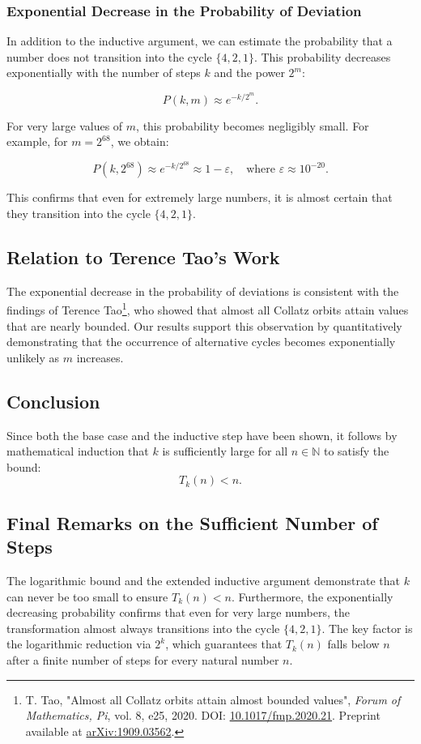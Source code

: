 \documentclass[a4paper,12pt]{article}
\begin{document}
\subsubsection{Exponential Decrease in the Probability of Deviation}
In addition to the inductive argument, we can estimate the probability that a number does not transition into the cycle \( \{4,2,1\} \). This probability decreases exponentially with the number of steps \( k \) and the power \( 2^m \):

\[
P(k, m) \approx e^{-k/2^m}.
\]

For very large values of \( m \), this probability becomes negligibly small. For example, for \( m = 2^{68} \), we obtain:

\[
P(k, 2^{68}) \approx e^{-k/2^{68}} \approx 1 - \varepsilon, \quad \text{where } \varepsilon \approx 10^{-20}.
\]

This confirms that even for extremely large numbers, it is almost certain that they transition into the cycle \( \{4,2,1\} \).

\subsection{Relation to Terence Tao's Work}
The exponential decrease in the probability of deviations is consistent with the findings of Terence Tao\footnote{T. Tao, "Almost all Collatz orbits attain almost bounded values", \textit{Forum of Mathematics, Pi}, vol. 8, e25, 2020. DOI: \href{https://doi.org/10.1017/fmp.2020.21}{10.1017/fmp.2020.21}. Preprint available at \href{https://arxiv.org/abs/1909.03562}{arXiv:1909.03562}.}, who showed that almost all Collatz orbits attain values that are nearly bounded. Our results support this observation by quantitatively demonstrating that the occurrence of alternative cycles becomes exponentially unlikely as \( m \) increases.

\subsection{Conclusion}
Since both the base case and the inductive step have been shown, it follows by mathematical induction that \( k \) is sufficiently large for all \( n \in \mathbb{N} \) to satisfy the bound:
\[
T_k(n) < n.
\]

\subsection{Final Remarks on the Sufficient Number of Steps}
The logarithmic bound and the extended inductive argument demonstrate that \( k \) can never be too small to ensure \( T_k(n) < n \). Furthermore, the exponentially decreasing probability confirms that even for very large numbers, the transformation almost always transitions into the cycle \( \{4,2,1\} \). The key factor is the logarithmic reduction via \( 2^k \), which guarantees that \( T_k(n) \) falls below \( n \) after a finite number of steps for every natural number \( n \).
\end{document}
